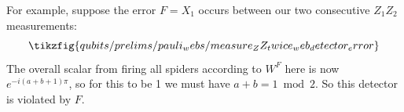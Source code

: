For example, suppose the error $F = X_1$ occurs between our two consecutive $Z_1 Z_2$ measurements:
\begin{equation}
    \tikzfig{qubits/prelims/pauli_webs/measure_ZZ_twice_web_detector_error}
\end{equation}
The overall scalar from firing all spiders according to $W^F$ here is now $e^{-i(a + b + 1)\pi}$, so for this to be 1 we must have $a + b = 1 \bmod 2$.
So this detector is violated by $F$.
%
%
%
